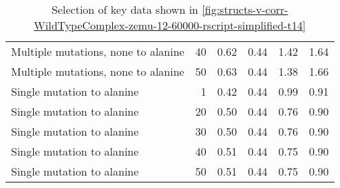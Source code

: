 \begin{table}
\begin{tabular}{lrrrrr}
 Multiple mutations, none to alanine &          40 &          0.62 &                    0.44 &            1.42 &                      1.64 \\
 Multiple mutations, none to alanine &          50 &          0.63 &                    0.44 &            1.38 &                      1.66 \\
          Single mutation to alanine &           1 &          0.42 &                    0.44 &            0.99 &                      0.91 \\
          Single mutation to alanine &          20 &          0.50 &                    0.44 &            0.76 &                      0.90 \\
          Single mutation to alanine &          30 &          0.50 &                    0.44 &            0.76 &                      0.90 \\
          Single mutation to alanine &          40 &          0.51 &                    0.44 &            0.75 &                      0.90 \\
          Single mutation to alanine &          50 &          0.51 &                    0.44 &            0.75 &                      0.90 \\
\bottomrule
\end{tabular}

\caption[]{Selection of key data shown in \cref{fig:structs-v-corr-WildTypeComplex-zemu-12-60000-rscript-simplified-t14}}
\label{tab:structs-v-corr-WildTypeComplex-zemu-12-60000-rscript-simplified-t14-underlying-data}
\end{table}
